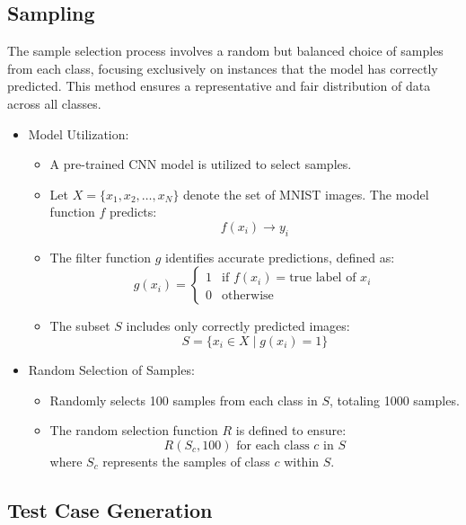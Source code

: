 \documentclass[10pt, conference, a4paper, final]{IEEEtran}
\begin{document}
\subsection{Sampling}
 The sample selection process involves a random but balanced choice of samples from each class, focusing exclusively on instances that the model has correctly predicted. This method ensures a representative and fair distribution of data across all classes.

\begin{itemize}

    
        \item Model Utilization:
            \begin{itemize}
                \item A pre-trained CNN model is utilized to select samples.
                \item Let \( X = \{x_1, x_2, \dots, x_N\} \) denote the set of MNIST images. The model function \( f \) predicts:
                \[ f(x_i) \rightarrow y_i \]
                \item The filter function \( g \) identifies accurate predictions, defined as:
                \[ g(x_i) = 
                \begin{cases} 
                1 & \text{if } f(x_i) = \text{true label of } x_i \\
                0 & \text{otherwise}
                \end{cases} \]
                \item The subset \( S \) includes only correctly predicted images:
                \[ S = \{x_i \in X \mid g(x_i) = 1\} \]
            \end{itemize}
        \item Random Selection of Samples:
            \begin{itemize}
                \item Randomly selects 100 samples from each class in \( S \), totaling 1000 samples.
                \item The random selection function \( R \) is defined to ensure:
                \[ R(S_c, 100) \text{ for each class } c \text{ in } S \]
                where \( S_c \) represents the samples of class \( c \) within \( S \).
            \end{itemize}

\end{itemize}


\subsection{Test Case Generation}
\end{document}
